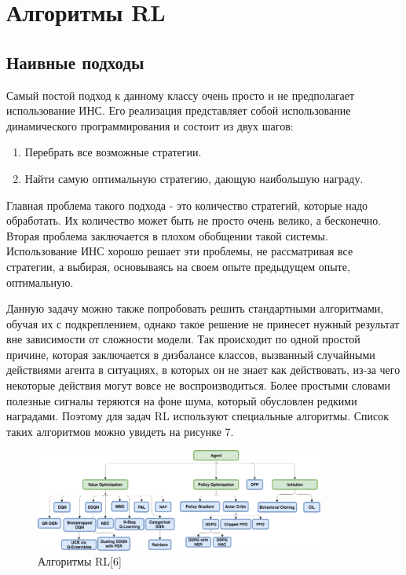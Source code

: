 \documentclass[bachelor, och, referat]{shiza}
\begin{document}
\section{Алгоритмы RL}
\subsection{Наивные подходы}
Самый постой подход к данному классу очень просто и не предполагает использование ИНС. Его реализация представляет собой использование динамического программирования и
состоит из двух шагов:
\begin{enumerate}
    \item Перебрать все возможные стратегии.
    \item Найти самую оптимальную стратегию, дающую наибольшую награду.
\end{enumerate}
Главная проблема такого подхода - это количество стратегий, которые надо обработать. Их количество может быть не просто очень велико, а бесконечно. Вторая проблема
заключается в плохом обобщении такой системы. Использование ИНС хорошо решает эти проблемы, не рассматривая все стратегии, а выбирая, основываясь на своем опыте
предыдущем опыте, оптимальную.

Данную задачу можно также попробовать решить стандартными алгоритмами, обучая их с подкреплением, однако такое решение не принесет нужный результат вне зависимости от сложности модели.
Так происходит по одной простой причине, которая заключается в дизбалансе классов, вызванный случайными действиями агента в ситуациях, в которых он не знает как действовать,
из-за чего некоторые действия могут вовсе не воспроизводиться. Более простыми словами полезные сигналы теряются на фоне шума, который обусловлен редкими наградами. Поэтому для
задач RL используют специальные алгоритмы. Список таких алгоритмов можно увидеть на рисунке 7.

\begin{figure}[H]
    \centering
    \includegraphics[width=0.85\textwidth]{pic/2}
    \caption{Алгоритмы RL[6]}
    \label{fig:img1}
\end{figure}
\end{document}
